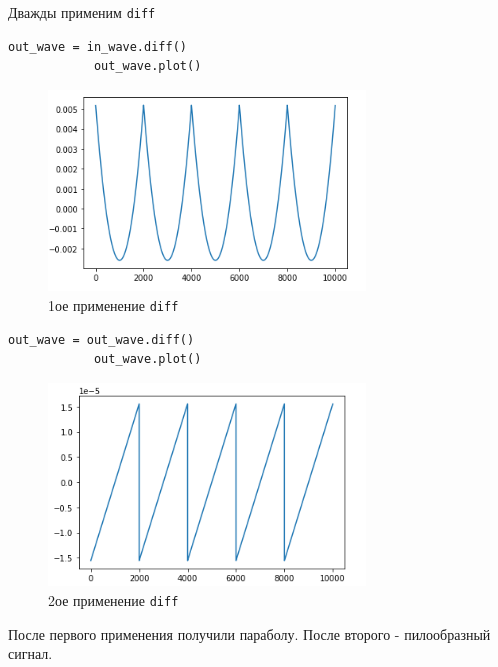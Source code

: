 \documentclass[a4paper,12pt]{article}
\begin{document}
\begin{enumerate}
		Дважды применим \texttt{diff}
		\begin{lstlisting}[caption=1ое применение \texttt{diff}]
			out_wave = in_wave.diff()
			out_wave.plot()
		\end{lstlisting}
		\begin{figure}[H]
			\centering
			\includegraphics[width=0.75\textwidth]{5_2.png}
			\caption{1ое применение \texttt{diff}}
			\label{fig:5.2}
		\end{figure}
		\begin{lstlisting}[caption=2ое применение \texttt{diff}]
			out_wave = out_wave.diff()
			out_wave.plot()
		\end{lstlisting}
		\begin{figure}[H]
			\centering
			\includegraphics[width=0.75\textwidth]{5_3.png}
			\caption{2ое применение \texttt{diff}}
			\label{fig:5.3}
		\end{figure}
		
		После первого применения получили параболу.
		После второго - пилообразный сигнал.
		

\end{enumerate}
\end{document}
